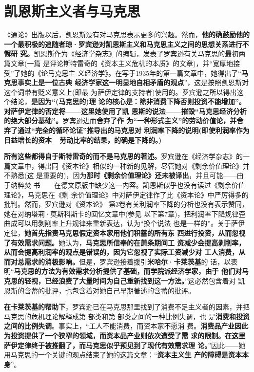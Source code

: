 \section{凯恩斯主义者与马克思}
《通论》出版以后，凯恩斯没有对马克思表示更多的兴趣。然而，\textbf{他的确鼓励他的
  一个最积极的追随者琼·罗宾逊对凯恩斯主义和马克思主义之间的思想关系进行不懈研
  究。}凯恩斯作为《经济学杂志》的编辑，发表了罗宾逊有关马克思的最初两篇文章(一篇
是评论斯特雷奇的《资本主义危机的本质》的文章)，并“宽厚地接受”了她的《论马克思主
义经济学》。在写于1935年的第一篇文章中，她得出了“\textbf{马克思事实上是一位古典
  经济学家这一明显地自相矛盾的观点}”，这是按照凯恩斯对这个词带有贬义意义上(即最
为萨伊定律的支持者)使用的。罗宾逊之所以得出这个结论，\textbf{是因为“(马克思的)理
  论的核心是：除非消费下降否则投资不能增加”。对萨伊定律的否定将——这里她使用了凯
  恩斯的说法——摧毁“马克思经济分析的绝大部分基础”。}罗宾逊进而\textbf{舍弃了作
  为“一种形式主义”的劳动价值论，并舍弃了通过“完全的循环论证”推导出的马克思对
  利润率下降的说明(即使利润率作为日益增长的资本—劳动比率的结果，的确是下降的。)}

\textbf{所有这些都得自于斯特雷奇的而不是马克思的著述。}罗宾逊在《经济学杂志》的一
篇文章中，得出同《资本论》相似的一种新的见解，尽管她对《剩余价值理论》并不熟悉(这
是重要的)，因为\textbf{那时《剩余价值理论》还未被译出}，并且可能——由于纳粹焚
书——在德文原版中缺少这一内容。凯恩斯似乎也没有读过《剩余价值理论》，马克思在《剩
余价值理论》中对萨伊定律作了比《资本论》中严厉得多的批判。然而，罗宾逊对《资本论》
第3卷有关利润率下降的分析也没有表示赞同，她在对纳塔莉·莫斯科斯卡的回忆文章中(参见
以下第7章)，把利润率下降规律歪曲成可以用剥削率上升规律来重新表达，认为“换个说法
也是一样的”。关于萨伊定律，\textbf{她首先指责马克思假定资本家用他们积蓄的所有东
  西进行投资，从而忽视了有效需求问题。}她认为，\textbf{马克思所信奉的在萧条期间工
  资减少会提高剥削率，从而会提高利润率的观点是错误的，因为它忽视了实际工资减少对
  工人消费，从而对总需求的消极影响。}但是，罗宾逊接着援引\textbf{米哈尔·卡莱茨基}的
话，以表明“\textbf{马克思的方法为有效需求分析提供了基础，而学院派经济学家，由于
  他们对马克思的轻视，已经浪费了大量时间为自己重新找到这一方法。}”这必然包含着对
凯恩斯的含蓄的批评，也包含着对她自己早期著述的含蓄的批评。

\textbf{在卡莱茨基的帮助下}，罗宾逊已在马克思那里找到了消费不足主义者的因素，并把
马克思的危机理论解释成第 部类和第 部类之间的一种比例失调，也
是\textbf{消费和投资之间的比例失调}。事实上，“工人不能消费，而资本家不愿消
费。\textbf{消费品产业因此为投资提供了一个狭窄的领域，而资本品产业则依次遭受了需
  求的限制。在这里萨伊定律终于被推翻了，而马克思似乎预见到了现代有效需求理
  论。}”因此——她用马克思的一个关键的观点结束了她的这篇文章：“\textbf{资本主义生
  产的障碍是资本本身}”。

